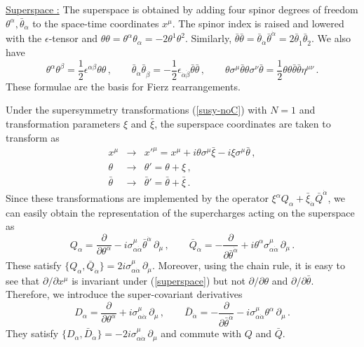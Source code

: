 \noindent\underline{Superspace :} 
\noindent The superspace is obtained by adding four spinor degrees of
freedom $\theta^\alpha,\bar\theta_{\dot\alpha}$ to the space-time
coordinates $x^\mu$. The spinor index is raised and lowered with the 
$\epsilon$-tensor and $\theta\theta = \theta^\alpha\theta_\alpha = -2
\theta^1\theta^2$. Similarly, $\bar\theta\bar\theta=
\bar\theta_{\dot\alpha}\bar\theta^{\dot\alpha}= 2\bar\theta_{\dot 1} 
\bar\theta_{\dot 2}$. We also have
$$
\theta^{\alpha}\theta^{\beta}=\frac{1}{2} \epsilon^{\alpha \beta}
\theta \theta\,,\qquad
\bar{\theta}_{\dot{\alpha}}\bar{\theta}_{\dot{\beta}}=-\frac{1}{2}
\epsilon_{\dot{\alpha}\dot{\beta}} \bar{\theta}\bar{\theta}\,,\qquad
\theta \sigma^\mu \bar{\theta} \theta \sigma^\nu \bar{\theta}=
\frac{1}{2}\theta \theta \bar{\theta}\bar{\theta} \eta^{\mu\nu}\,.
$$
These formulae are the basis for Fierz rearrangements. 
 
Under the supersymmetry transformations (\ref{susy-noC}) with $N=1$
and transformation parameters $\xi$ and $\bar\xi$, the superspace
coordinates are taken to transform as  
\begin{eqnarray}
x^\mu &\rightarrow& x'^\mu=x^\mu + i\theta\sigma^\mu\bar\xi
- i\xi\sigma^\mu\bar\theta \,,\nonumber\\
\theta &\rightarrow&\theta'=\theta + \xi\,, \nonumber\\
\bar\theta &\rightarrow& \bar\theta'=\bar\theta +\bar\xi\,.
\label{superspace}
\end{eqnarray}
Since these transformations are implemented by the operator 
$\xi^\alpha Q_\alpha + \bar{\xi}_{\dot\alpha}\bar{Q}^{\dot\alpha}$, we
can easily obtain the representation of the supercharges acting on the
superspace as 
\begin{equation}
Q_\alpha=\frac{\partial}{\partial\theta^\alpha}- 
i\sigma^\mu_{\alpha\dot{\alpha}}\bar{\theta}^{\dot{\alpha}}\,
\partial_\mu\,,\qquad \bar{Q}_{\dot\alpha} = -\frac{\partial}{\partial
\bar{\theta}^{\dot\alpha}}+i\theta^\alpha 
\sigma^\mu_{\alpha\dot{\alpha}}\, \partial_\mu\,.
\label{superspace-Q}
\end{equation}
These satisfy $\{Q_\alpha ,\bar{Q}_{\dot\alpha}\}= 
2i\sigma^\mu_{\alpha\dot\alpha}\,\partial_\mu$.
Moreover, using the chain rule, it is easy to see that 
$\partial/\partial x^\mu$ is invariant under (\ref{superspace}) but
not $\partial/\partial\theta$ and $\partial/\partial\bar\theta$.   
Therefore, we introduce the super-covariant derivatives
\begin{equation}
D_\alpha = \frac{\partial}{\partial \theta^\alpha} +
i\sigma^\mu_{\alpha\dot\alpha}\,\partial_\mu \,,\qquad
\bar{D}_{\dot{\alpha}} = -\frac{\partial}{\partial
\bar{\theta}^{\dot{\alpha}}}-i\sigma^\mu_{\alpha \dot{\alpha}}
\theta^{\alpha} \, \partial_\mu \,.
\label{superspaceD}
\end{equation}
They satisfy $\{ D_\alpha,\bar{D}_{\dot\alpha}\}=-2i\sigma^\mu_{\alpha
\dot{\alpha}}\,\partial_\mu$ and commute with $Q$ and $\bar Q$.

